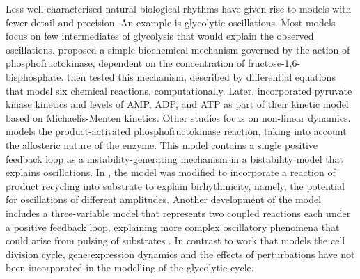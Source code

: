 Less well-characterised natural biological rhythms have given rise to models with fewer detail and precision.
An example is glycolytic oscillations.
Most models focus on few intermediates of glycolysis that would explain the observed oscillations.
\textcite{ghoshOscillationsGlycolyticIntermediates1964} proposed a simple biochemical mechanism governed by the action of phosphofructokinase, dependent on the concentration of fructose-1,6-bisphosphate.
\textcite{higginsChemicalMechanismOscillation1964} then tested this mechanism, described by differential equations that model six chemical reactions, computationally.
Later, \textcite{termoniaOscillationsControlFeatures1981} incorporated pyruvate kinase kinetics and levels of AMP, ADP, and ATP as part of their kinetic model based on Michaelis-Menten kinetics.
Other studies focus on non-linear dynamics.
\textcite{goldbeterDissipativeStructuresAllosteric1972} models the product-activated phosphofructokinase reaction, taking into account the allosteric nature of the enzyme.
This model contains a single positive feedback loop as a instability-generating mechanism in a bistability model that explains oscillations.
In \textcite{moranOnsetBirhythmicityRegulated1984}, the model was modified to incorporate a reaction of product recycling into substrate to explain birhythmicity, namely, the potential for oscillations of different amplitudes.
Another development of the model includes a three-variable model that represents two coupled reactions each under a positive feedback loop, explaining more complex oscillatory phenomena that could arise from pulsing of substrates \parencite{decrolyBirhythmicityChaosOther1982}.
In contrast to work that models the cell division cycle, gene expression dynamics and the effects of perturbations have not been incorporated in the modelling of the glycolytic cycle.

